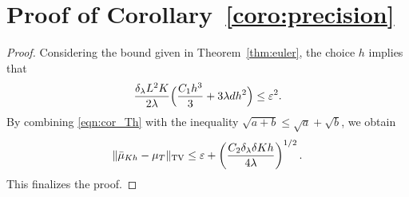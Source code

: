 
\section{Proof of Corollary~\ref{coro:precision}}
\begin{proof}
Considering the bound given in Theorem~\ref{thm:euler}, the choice $h$ implies that
\begin{align}
\frac{\delta_\lambda L^2 K}{2\lambda} \Bigl( \frac{C_1 h^3}{3} + 3 \lambda d h^2 \Bigr) \leq \varepsilon^2. \label{eqn:cor_Th}
\end{align}
By combining \eqref{eqn:cor_Th} with the inequality $\sqrt{a+b}\leq \sqrt{a} + \sqrt{b}$, we obtain 
\begin{align}
\| \bar{\mu}_{Kh} - \mu_T \|_{\textnormal{TV}} \leq \varepsilon + \left(\frac{C_2 \delta_\lambda \delta K h}{4\lambda}\right)^{1/2} .
\end{align}
This finalizes the proof. 
\end{proof}



